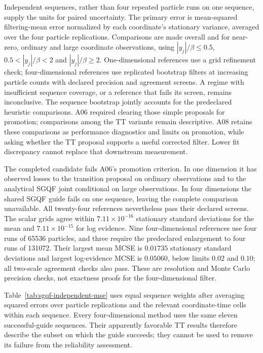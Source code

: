 \documentclass[11pt]{article}
\begin{document}
Independent sequences, rather than four repeated particle runs on one
sequence, supply the units for paired uncertainty. The primary error is
mean-squared filtering-mean error normalized by each coordinate's stationary
variance, averaged over the four particle replications. Comparisons are made
overall and for near-zero, ordinary and large coordinate observations, using
$|y_j|/\beta\leq0.5$, $0.5<|y_j|/\beta<2$ and $|y_j|/\beta\geq2$.
One-dimensional references use a grid refinement check; four-dimensional
references use replicated bootstrap filters at increasing particle counts
with declared precision and agreement screens. A regime with insufficient
sequence coverage, or a reference that fails its screen, remains inconclusive.
The sequence bootstrap jointly accounts for the predeclared heuristic
comparisons. A06 required clearing those simple proposals for promotion;
comparisons among the TT variants remain descriptive. A08 retains these
comparisons as performance diagnostics and limits on promotion, while asking
whether the TT proposal supports a useful corrected filter. Lower fit
discrepancy cannot replace that downstream measurement.

The completed candidate fails A06's promotion criterion. In one dimension it has
observed losses to the transition proposal on ordinary observations and to
the analytical SGQF joint conditional on large observations. In four
dimensions the shared SGQF guide fails on one sequence, leaving the complete
comparison unavailable. All twenty-four references nevertheless pass their
declared screens. The scalar grids agree within $7.11\times10^{-16}$
stationary standard deviations for the mean and $7.11\times10^{-15}$ for
log evidence. Nine four-dimensional references use four runs of 65536
particles, and three require the predeclared enlargement to four runs of
131072. Their largest mean MCSE is $0.01735$ stationary standard deviations
and largest log-evidence MCSE is $0.05060$, below limits $0.02$ and $0.10$;
all two-scale agreement checks also pass. These are resolution and Monte
Carlo precision checks, not exactness proofs for the four-dimensional filter.

Table~\ref{tab:sgqf-independent-mse} uses equal sequence weights after
averaging squared errors over particle replications and the relevant
coordinate-time cells within each sequence. Every four-dimensional method
uses the same eleven successful-guide sequences. Their apparently favorable
TT results therefore describe the subset on which the guide succeeds; they
cannot be used to remove its failure from the reliability assessment.
\end{document}
